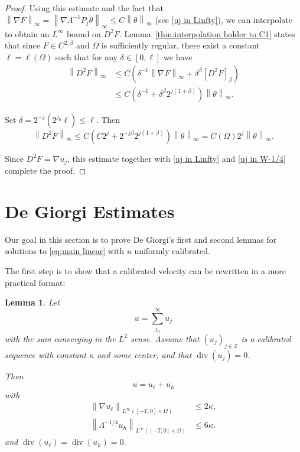 \documentclass[11pt]{amsart}
\newtheorem{lemma}[theorem]{Lemma}
\theoremstyle{remark}
\theoremstyle{definition}
\newcommand{\Z}{\mathbb{Z}}
\newcommand{\norm}[1]{\left\lVert#1\right\rVert}
\newcommand{\paren}[1]{\left( #1 \right)}
\newcommand{\bracket}[1]{\left[ #1 \right]}
\newcommand{\grad}{\nabla}
\renewcommand{\div}{\operatorname{div}}
\newcommand{\n}{^{-1}}
\newcommand{\ulow}{u_\ell}
\newcommand{\uhigh}{u_h}
\newcounter{step_count}[section]
\begin{document}
\begin{proof}
Using this estimate and the fact that $\norm{\grad F}_\infty = \norm{\grad \Lambda^{-1} P_j \theta}_\infty \leq C \norm{\theta}_\infty$ (see \eqref{uj in Linfty}), we can interpolate to obtain an $L^\infty$ bound on $D^2 F$.  
Lemma~\ref{thm:interpolation holder to C1} states that since $F \in C^{2,\beta}$ and $\Omega$ is sufficiently regular, there exist a constant $\ell = \ell(\Omega)$ such that for any $\delta \in [0, \ell]$ we have
\begin{align*}
\norm{D^2 F}_\infty &\leq C \paren{\delta\n \norm{\grad F}_\infty + \delta^{\beta} \bracket{D^2 F}_\beta}
\\ &\leq C \paren{\delta\n + \delta^\beta 2^{j(1+\beta)}} \norm{\theta}_\infty.  
\end{align*}

Set $\delta = 2^{-j} (2^{j_0} \ell) \leq \ell$.  Then
\[ \norm{D^2 F}_\infty \leq C \paren{C 2^j + 2^{-j\beta} 2^{j(1+\beta)}} \norm{\theta}_\infty = C(\Omega) 2^j \norm{\theta}_\infty. \]

Since $D^2 F = \grad u_j$, this estimate together with \eqref{uj in Linfty} and \eqref{uj in W-1/4} complete the proof.  
\end{proof}



\section{De Giorgi Estimates} \label{sec:de giorgi}

Our goal in this section is to prove De Giorgi's first and second lemmas for solutions to \eqref{eq:main linear} with $u$ uniformly calibrated.  

The first step is to show that a calibrated velocity can be rewritten in a more practical format:
\begin{lemma} \label{thm:calibration is good}
Let 
\[ u = \sum_{j_0}^\infty u_j \]
with the sum converging in the $L^2$ sense.  Assume that $(u_j)_{j \in \Z}$ is a calibrated sequence with constant $\kappa$ and some center, and that $\div(u_j)=0$.  

Then
\[ u = \ulow + \uhigh \]
with 
\begin{align*} 
\norm{\grad \ulow}_{L^\infty([-T,0]\times \Omega)} &\leq 2 \kappa, \\
\norm{\Lambda^{-1/4} \uhigh}_{L^\infty([-T,0]\times\Omega)} &\leq 6 \kappa. 
\end{align*}
and $\div(\ulow) = \div(\uhigh) = 0$.  
\end{lemma}
\end{document}
